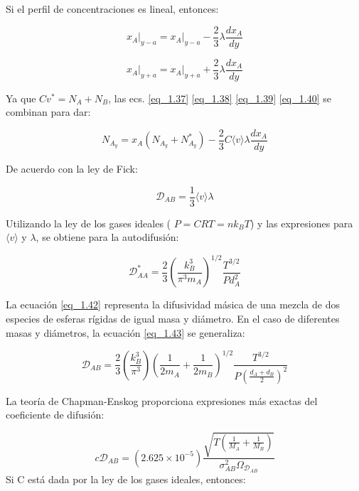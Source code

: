 Si el perfil de concentraciones es lineal, entonces:

\begin{equation}
x_A \bigg|_{y-a} = x_A \bigg|_{y-a} - \frac{2}{3}\lambda \frac{dx_A}{dy}
\tag{1.39} \label{eq_1.39}
\end{equation}

\begin{equation}
x_A \bigg|_{y+a} = x_A \bigg|_{y+a} + \frac{2}{3}\lambda \frac{dx_A}{dy}
\tag{1.40} \label{eq_1.40}
\end{equation}

Ya que \( Cv^* = N_A + N_B \), las ecs. \ref{eq_1.37} \ref{eq_1.38} \ref{eq_1.39} \ref{eq_1.40} se combinan para dar:

\begin{equation}
N_{A_{y}} = x_A \left( N_{A_y} + N_{A_y}^* \right) - \frac{2}{3}C \langle v \rangle \lambda \frac{dx_A}{dy} \tag{1.41}\label{eq_1.41}
\end{equation}

De acuerdo con la ley de Fick:

\begin{equation}
\mathscr{D}_{AB} = \frac{1}{3} \langle v \rangle \lambda  \tag{1.42}\label{eq_1.42}
\end{equation}

Utilizando la ley de los gases ideales ( $P = CRT = nk_BT $) y las expresiones para \( \langle v \rangle \) y \( \lambda \), se obtiene para la autodifusión:

\begin{equation}
\mathscr{D}_{AA}^* = \frac{2}{3} \left( \frac{k_B^3}{\pi^3 m_A} \right)^{1/2} \frac{T^{3/2}}{P d_A^2}\tag{1.43}\label{eq_1.43}
\end{equation}

La ecuación \ref{eq_1.42} representa la difusividad másica de una mezcla de dos especies de esferas rígidas de igual masa y diámetro. En el caso de diferentes masas y diámetros, la ecuación \ref{eq_1.43} se generaliza:

\begin{equation}
\mathscr{D}_{AB} = \frac{2}{3} \left( \frac{k_B^3}{\pi^3} \right) \left( \frac{1}{2 m_A} + \frac{1}{2 m_B} \right)^{1/2} \frac{T^{3/2}}{P \left( \frac{d_A + d_B}{2} \right)^2}\tag{1.44}\label{eq_1.44}
\end{equation}

La teoría de Chapman-Enskog proporciona expresiones más exactas del coeficiente de difusión:

\begin{equation}
c \mathscr{D}_{AB} = (2.625 \times 10^{-5}) \frac{\sqrt{T(\frac{1}{M_A}+\frac{1}{M_B})}}{\sigma_{AB}^2 \Omega_{\mathscr{D}_{AB}}}\tag{1.45}\label{eq_1.45}
\end{equation}
Si C está dada por la ley de los gases ideales, entonces:


